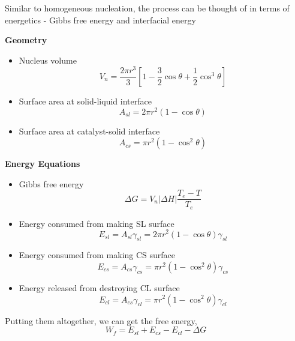 
Similar to homogeneous nucleation, the process can be thought of in terms of energetics - Gibbs free energy and interfacial energy

\textbf{Geometry}
\begin{itemize}
  \item Nucleus volume
  \begin{equation}
    V_n = \frac{2\pi r^3}{3}\left[1- \frac{3}{2}\cos\theta+\frac{1}{2}\cos^3\theta\right]
  \end{equation}
  \item Surface area at solid-liquid interface
  \begin{equation}
    A_{sl} = 2\pi r^2 (1 - \cos\theta)
  \end{equation}
  \item Surface area at catalyst-solid interface
  \begin{equation}
    A_{cs} = \pi r^2 (1 - \cos^2\theta)
  \end{equation}
\end{itemize}
\textbf{Energy Equations}
\begin{itemize}
  \item Gibbs free energy
  \begin{equation}
    \Delta G = V_n|\Delta H|\frac{T_e - T}{T_e}
  \end{equation}
  \item Energy consumed from making SL surface
  \begin{equation}
    E_{sl} = A_{sl}\gamma_{sl} = 2\pi r^2 (1 - \cos\theta)\gamma_{sl}
  \end{equation}
  \item Energy consumed from making CS surface
  \begin{equation}
    E_{cs} = A_{cs}\gamma_{cs} = \pi r^2 (1 - \cos^2\theta)\gamma_{cs}
  \end{equation}
  \item Energy released from destroying CL surface
  \begin{equation}
    E_{cl} = A_{cs}\gamma_{cl} = \pi r^2 (1 - \cos^2\theta)\gamma_{cl}
  \end{equation}
\end{itemize}

Putting them altogether, we can get the free energy,
\begin{equation}
  W_f = E_{sl} + E_{cs} - E_{cl} - \Delta G
\end{equation}

